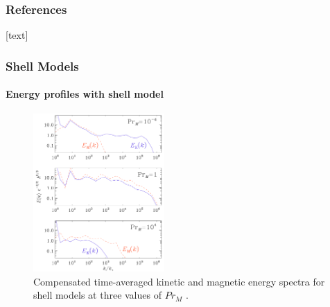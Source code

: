 \documentclass{beamer}
\begin{document}
\begin{frame}
\frametitle{References}

[text]



\end{frame}

\begin{frame}
 \frametitle{Shell Models}
 \framesubtitle{Energy profiles with shell model}
  
   \begin{figure}[t]
  \includegraphics[width=5cm]{img/E_B_profile}
  \caption{Compensated time-averaged kinetic and magnetic energy spectra for
shell models at three values of $Pr_M$ \cite{brandenburg2014magnetic}.}
  \centering
 \end{figure}
  
\end{frame}
\end{document}
